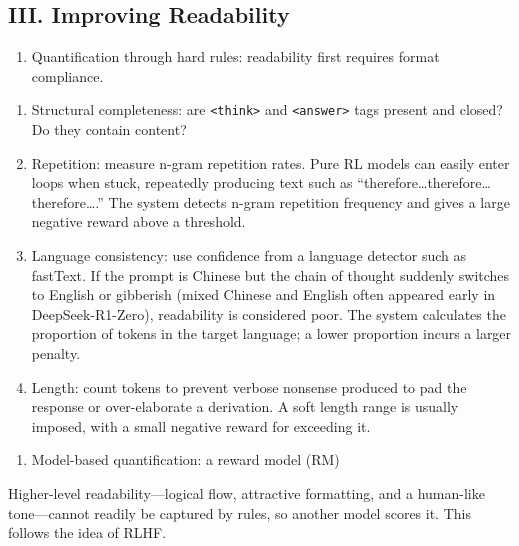 \hypertarget{iii.-improving-readability}{%
\subsection{III. Improving Readability}\label{iii.-improving-readability}}

\begin{enumerate}
\def\labelenumi{\arabic{enumi}.}
\tightlist
\item
  Quantification through hard rules: readability first requires format compliance.
\end{enumerate}

\begin{enumerate}
\def\labelenumi{(\arabic{enumi})}
\item
  Structural completeness: are \texttt{\textless{}think\textgreater{}} and \texttt{\textless{}answer\textgreater{}} tags present and closed? Do they contain content?
\item
  Repetition: measure n-gram repetition rates. Pure RL models can easily enter loops when stuck, repeatedly producing text such as ``therefore\ldots therefore\ldots therefore\ldots.'' The system detects n-gram repetition frequency and gives a large negative reward above a threshold.
\item
  Language consistency: use confidence from a language detector such as fastText. If the prompt is Chinese but the chain of thought suddenly switches to English or gibberish (mixed Chinese and English often appeared early in DeepSeek-R1-Zero), readability is considered poor. The system calculates the proportion of tokens in the target language; a lower proportion incurs a larger penalty.
\item
  Length: count tokens to prevent verbose nonsense produced to pad the response or over-elaborate a derivation. A soft length range is usually imposed, with a small negative reward for exceeding it.
\end{enumerate}

\begin{enumerate}
\def\labelenumi{\arabic{enumi}.}
\setcounter{enumi}{1}
\tightlist
\item
  Model-based quantification: a reward model (RM)
\end{enumerate}

Higher-level readability---logical flow, attractive formatting, and a human-like tone---cannot readily be captured by rules, so another model scores it. This follows the idea of RLHF.

